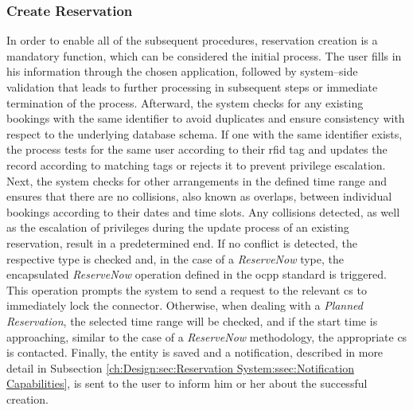 \newpage

\subsubsection{Create Reservation}
\label{ch:Design:sec:Reservation System:ssec:Management Capabilities:sssec:Create Reservation}

In order to enable all of the subsequent procedures, reservation creation is a mandatory function, which can be considered the initial process. The user fills in his information through the chosen application, followed by system--side validation that leads to further processing in subsequent steps or immediate termination of the process.
Afterward, the system checks for any existing bookings with the same identifier to avoid duplicates and ensure consistency with respect to the underlying database schema. If one with the same identifier exists, the process tests for the same user according to their \acrshort{rfid} tag and updates the record according to matching tags or rejects it to prevent privilege escalation.
Next, the system checks for other arrangements in the defined time range and ensures that there are no collisions, also known as overlaps, between individual bookings according to their dates and time slots.
Any collisions detected, as well as the escalation of privileges during the update process of an existing reservation, result in a predetermined end.
If no conflict is detected, the respective type is checked and, in the case of a \textit{ReserveNow} type, the encapsulated \textit{ReserveNow} operation defined in the \acrshort{ocpp} standard \cite{noauthor_ocpp_nodate} is triggered. This operation prompts the system to send a request to the relevant \acrshort{cs} to immediately lock the connector. 
Otherwise, when dealing with a \textit{Planned Reservation}, the selected time range will be checked, and if the start time is approaching, similar to the case of a \textit{ReserveNow} methodology, the appropriate \acrshort{cs} is contacted.
Finally, the entity is saved and a notification, described in more detail in Subsection \ref{ch:Design:sec:Reservation System:ssec:Notification Capabilities}, is sent to the user to inform him or her about the successful creation.

